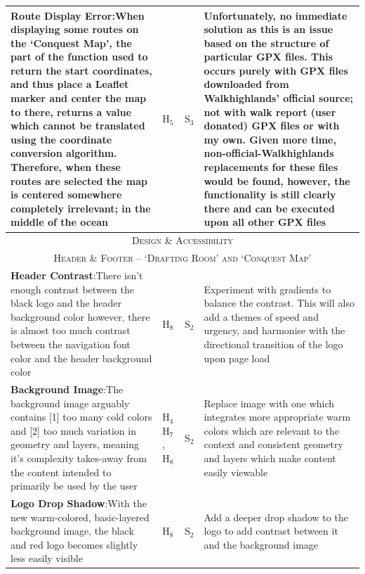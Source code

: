 \documentclass[11pt, english]{article}
\begin{document}
\begin{center}
\begin{longtable}{p{7.5cm}p{0.5cm}p{0.5cm}p{4cm}}
		\textbf{Route Display Error}:\newline When displaying some routes on the `Conquest Map', the part of the function used to return the start coordinates, and thus place a Leaflet marker and center the map to there, returns a value which cannot be translated using the coordinate conversion algorithm. Therefore, when these routes are selected the map is centered somewhere completely irrelevant; in the middle of the ocean & $\mathrm{H_{5}}$ & $\mathrm{S_{3}}$ & Unfortunately, no immediate solution as this is an issue based on the structure of particular GPX files. This occurs purely with GPX files downloaded from Walkhighlands' official source; not with walk report (user donated) GPX files or with my own. Given more time, non-official-Walkhighlands replacements for these files would be found, however, the functionality is still clearly there and can be executed upon all other GPX files\\
		\hline
		\hline
		\multicolumn{4}{c}{\textsc{Design \& Accessibility}}\\
		\hline
		\hline
		\multicolumn{4}{c}{\textsc{Header \& Footer -- `Drafting Room' and `Conquest Map'}}\\
		\hline
		\textbf{Header Contrast}:\newline There isn't enough contrast between the black logo and the header background color however, there is almost too much contrast between the navigation font color and the header background color & $\mathrm{H_{8}}$ & $\mathrm{S_{2}}$ & Experiment with gradients to balance the contrast. This will also add a themes of speed and urgency, and harmonise with the directional transition of the logo upon page load\\
		\textbf{Background Image}:\newline The background image arguably contains [1] too many cold colors and [2] too much variation in geometry and layers, meaning it's complexity takes-away from the content intended to primarily be used by the user & $\mathrm{H_{4}}$ $\mathrm{H_{7}}$, $\mathrm{H_{8}}$ & $\mathrm{S_{2}}$ & Replace image with one which integrates more appropriate warm colors which are relevant to the context and consistent geometry and layers which make content easily viewable\\
		\textbf{Logo Drop Shadow}:\newline With the new warm-colored, basic-layered background image, the black and red logo becomes slightly less easily visible & $\mathrm{H_{8}}$ & $\mathrm{S_{2}}$ & Add a deeper drop shadow to the logo to add contrast between it and the background image\\

\end{longtable}
\end{center}
\end{document}
